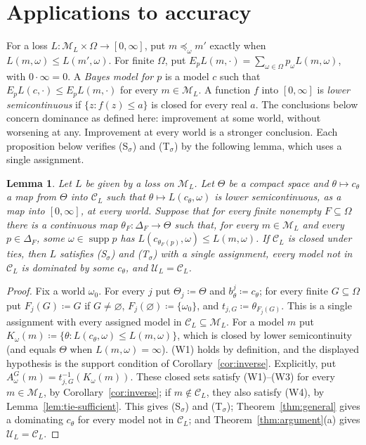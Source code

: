 \documentclass[11pt]{article}
\newtheorem{lemma}[theorem]{Lemma}
\theoremstyle{definition}
\theoremstyle{remark}
\newcommand{\M}{\mathcal M}
\newcommand{\C}{\mathcal C}
\newcommand{\U}{\mathcal U}
\newcommand{\supp}{\operatorname{supp}}
\begin{document}
\section{Applications to accuracy}\label{sec:short-applications}
For a loss $L:\M_L\times\Omega\to[0,\infty]$, put $m\preceq_\omega m'$ exactly when $L(m,\omega)\le L(m',\omega)$. For finite $\Omega$, put $E_pL(m,\cdot)=\sum_{\omega\in\Omega}p_\omega L(m,\omega)$, with $0\cdot\infty=0$. A \emph{Bayes model for $p$} is a model $c$ such that $E_pL(c,\cdot)\le E_pL(m,\cdot)$ for every $m\in\M_L$. A function $f$ into $[0,\infty]$ is \emph{lower semicontinuous} if $\{z:f(z)\le a\}$ is closed for every real $a$. The conclusions below concern dominance as defined here: improvement at some world, without worsening at any. Improvement at every world is a stronger conclusion. {\color{red}Each proposition below verifies (S$_\sigma$) and (T$_\sigma$) by the following lemma, which uses a single assignment.}

\begingroup\color{red}
\begin{lemma}\label{lem:loss-selection}
Let $L$ be given by a loss on $\M_L$. Let $\Theta$ be a compact space and $\theta\mapsto c_\theta$ a map from $\Theta$ into $\C_L$ such that $\theta\mapsto L(c_\theta,\omega)$ is lower semicontinuous, as a map into $[0,\infty]$, at every world. Suppose that for every finite nonempty $F\subseteq\Omega$ there is a continuous map $\theta_F:\Delta_F\to\Theta$ such that, for every $m\in\M_L$ and every $p\in\Delta_F$, some $\omega\in\supp p$ has $L(c_{\theta_F(p)},\omega)\le L(m,\omega)$. If $\C_L$ is closed under ties, then $L$ satisfies (S$_\sigma$) and (T$_\sigma$) with a single assignment, every model not in $\C_L$ is dominated by some $c_\theta$, and $\U_L=\C_L$.
\end{lemma}
\begin{proof}
Fix a world $\omega_0$. For every $j$ put $\Theta_j\coloneqq\Theta$ and $b^j_\theta\coloneqq c_\theta$; for every finite $G\subseteq\Omega$ put $F_j(G)\coloneqq G$ if $G\ne\varnothing$, $F_j(\varnothing)\coloneqq\{\omega_0\}$, and $t_{j,G}\coloneqq\theta_{F_j(G)}$. This is a single assignment with every assigned model in $\C_L\subseteq\M_L$. For a model $m$ put $K_\omega(m)\coloneqq\{\theta:L(c_\theta,\omega)\le L(m,\omega)\}$, which is closed by lower semicontinuity (and equals $\Theta$ when $L(m,\omega)=\infty$). (W1) holds by definition, and the displayed hypothesis is the support condition of Corollary~\ref{cor:inverse}. Explicitly, put $A^G_\omega(m)=t_{j,G}^{-1}(K_\omega(m))$. These closed sets satisfy (W1)--(W3) for every $m\in\M_L$, by Corollary~\ref{cor:inverse}; if $m\notin\C_L$, they also satisfy (W4), by Lemma~\ref{lem:tie-sufficient}. This gives (S$_\sigma$) and (T$_\sigma$); Theorem~\ref{thm:general} gives a dominating $c_\theta$ for every model not in $\C_L$; and Theorem~\ref{thm:argument}(a) gives $\U_L=\C_L$.
\end{proof}
\endgroup
\end{document}
